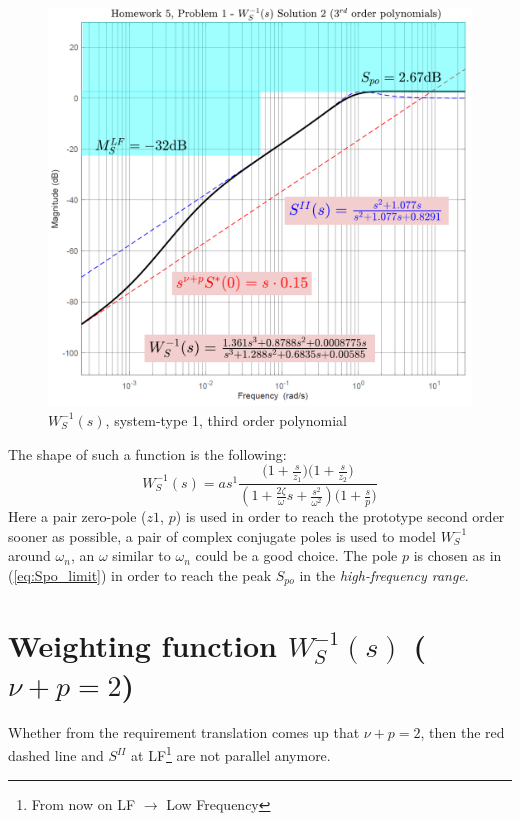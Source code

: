 \documentclass[a4paper, 12pt]{article}
\begin{document}
    \begin{figure}\label{fig:type1_3rd}
        \centering
        \includegraphics[scale=0.7]{img/Ws_type1_third.png}
        \caption{$W_S^{-1}(s)$, system-type 1, third order polynomial}
    \end{figure}
    The shape of such a function is the following:
    {\large{
        \begin{equation}
            W_S^{-1}(s) = a{s^{1}} \frac{
                \bigl(1+\frac{s}{z_1}\bigr)
                \bigl(1+\frac{s}{z_2}\bigr)
            }
            {
                {(1+\frac{2\zeta}{\omega}s+\frac{s^2}{\omega^2})}
                {\bigl(1+\frac{s}{p}\bigr)}
            }
        \end{equation}
    }}
    Here a pair zero-pole ($z1$, $p$) is used in order to reach the prototype second order sooner as possible, a pair of complex conjugate poles is used to model $W_S^{-1}$ around $\omega_n$, an $\omega$ similar to $\omega_n$ could be a good choice. The pole $p$ is chosen as in (\ref{eq:Spo_limit}) in order to reach the peak $S_{po}$ in the \textit{high-frequency range}. 

    \section{Weighting function $W_S^{-1}(s)$ ($\nu+p=2$)}
    Whether from the requirement translation comes up that $\nu+p=2$, then the red dashed line and $S^{II}$ at LF\footnote{
        From now on LF $\to$ Low Frequency
    } are not parallel anymore. 
\end{document}
